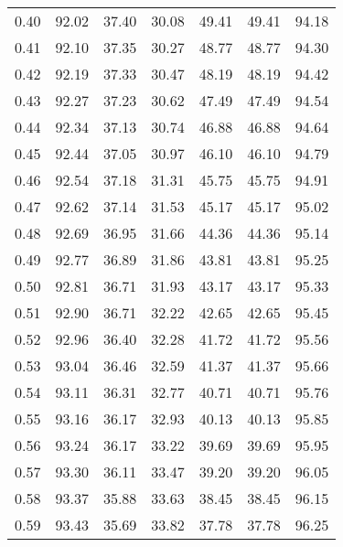 \begin{tabular}{|c|c|c|c|c|c|c|}
      0.40 &     92.02 &     37.40 &      30.08 &   49.41 &      49.41 &         94.18 \\
      0.41 &     92.10 &     37.35 &      30.27 &   48.77 &      48.77 &         94.30 \\
      0.42 &     92.19 &     37.33 &      30.47 &   48.19 &      48.19 &         94.42 \\
      0.43 &     92.27 &     37.23 &      30.62 &   47.49 &      47.49 &         94.54 \\
      0.44 &     92.34 &     37.13 &      30.74 &   46.88 &      46.88 &         94.64 \\
      0.45 &     92.44 &     37.05 &      30.97 &   46.10 &      46.10 &         94.79 \\
      0.46 &     92.54 &     37.18 &      31.31 &   45.75 &      45.75 &         94.91 \\
      0.47 &     92.62 &     37.14 &      31.53 &   45.17 &      45.17 &         95.02 \\
      0.48 &     92.69 &     36.95 &      31.66 &   44.36 &      44.36 &         95.14 \\
      0.49 &     92.77 &     36.89 &      31.86 &   43.81 &      43.81 &         95.25 \\
      0.50 &     92.81 &     36.71 &      31.93 &   43.17 &      43.17 &         95.33 \\
      0.51 &     92.90 &     36.71 &      32.22 &   42.65 &      42.65 &         95.45 \\
      0.52 &     92.96 &     36.40 &      32.28 &   41.72 &      41.72 &         95.56 \\
      0.53 &     93.04 &     36.46 &      32.59 &   41.37 &      41.37 &         95.66 \\
      0.54 &     93.11 &     36.31 &      32.77 &   40.71 &      40.71 &         95.76 \\
      0.55 &     93.16 &     36.17 &      32.93 &   40.13 &      40.13 &         95.85 \\
      0.56 &     93.24 &     36.17 &      33.22 &   39.69 &      39.69 &         95.95 \\
      0.57 &     93.30 &     36.11 &      33.47 &   39.20 &      39.20 &         96.05 \\
      0.58 &     93.37 &     35.88 &      33.63 &   38.45 &      38.45 &         96.15 \\
      0.59 &     93.43 &     35.69 &      33.82 &   37.78 &      37.78 &         96.25 \\

\end{tabular}
